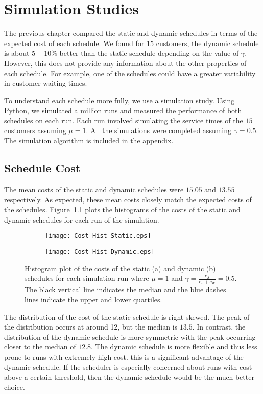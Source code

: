\chapter{Simulation Studies}
\label{chap:Simulation}
The previous chapter compared the static and dynamic schedules in terms of the expected cost of each schedule. We found for $15$ customers, the dynamic schedule is about $5 - 10 \%$ better than the static schedule depending on the value of $\gamma$. However, this does not provide any information about the other properties of each schedule. For example, one of the schedules could have a greater variability in customer waiting times.

To understand each schedule more fully, we use a simulation study. Using Python, we simulated a million runs and measured the performance of both schedules on each run. Each run involved simulating the service times of the $15$ customers assuming $\mu = 1$. All the simulations were completed assuming $\gamma = 0.5$. The simulation algorithm is included in the appendix.

\section{Schedule Cost}
The mean costs of the static and dynamic schedules were $15.05$ and $13.55$ respectively. As expected, these mean costs closely match the expected costs of the schedules. Figure~\ref{fig:Two_Cost} plots the histograms of the costs of the static and dynamic schedules for each run of the simulation.
\begin{figure}[htb]
	\centering
	\begin{subfigure}[t]{0.45\textwidth}
		\centering
		\texttt{[image: Cost\_Hist\_Static.eps]}
		\caption{}
	\end{subfigure}
	\begin{subfigure}[t]{0.45\textwidth}
		\centering
		\texttt{[image: Cost\_Hist\_Dynamic.eps]}
		\caption{}
	\end{subfigure}
	\caption{Histogram plot of the costs of the static (a) and dynamic (b) schedules for each simulation run where $\mu = 1$ and $\gamma = \frac{c_{S}}{c_{S} + c_{W}} = 0.5$. The black vertical line indicates the median and the blue dashes lines indicate the upper and lower quartiles.}
	\label{fig:Two_Cost}
\end{figure}

The distribution of the cost of the static schedule is right skewed. The peak of the distribution occurs at around 12, but the median is $13.5$. In contrast, the distribution of the dynamic schedule is more symmetric with the peak occurring closer to the median of $12.8$. The dynamic schedule is more flexible and thus less prone to runs with extremely high cost. this is a significant advantage of the dynamic schedule. If the scheduler is especially concerned about runs with cost above a certain threshold, then the dynamic schedule would be the much better choice.

